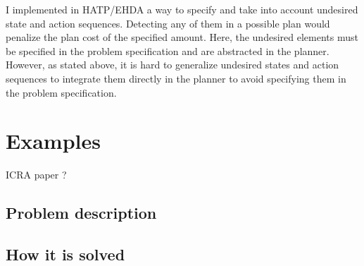 I implemented in HATP/EHDA a way to specify and take into account undesired state and action sequences. Detecting any of them in a possible plan would penalize the plan cost of the specified amount. Here, the undesired elements must be specified in the problem specification and are abstracted in the planner. However, as stated above, it is hard to generalize undesired states and action sequences to integrate them directly in the planner to avoid specifying them in the problem specification.   

\section{Examples}

ICRA paper ?

\subsection{Problem description}
\subsection{How it is solved}
